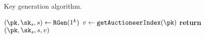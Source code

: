 \begin{algorithm}
    \caption{Key generation algorithm.}
    \label{alg:gen}
    \begin{algorithmic}[1]
        \State $(\pk, \sk_s, s) \gets \mathtt{RGen}(1^k)$
        \State $v \gets \mathtt{getAuctioneerIndex}(\pk)$
        \State \textbf{return} $(\pk, \sk_s, s, v)$
        \EndFunction
    \end{algorithmic}
\end{algorithm}